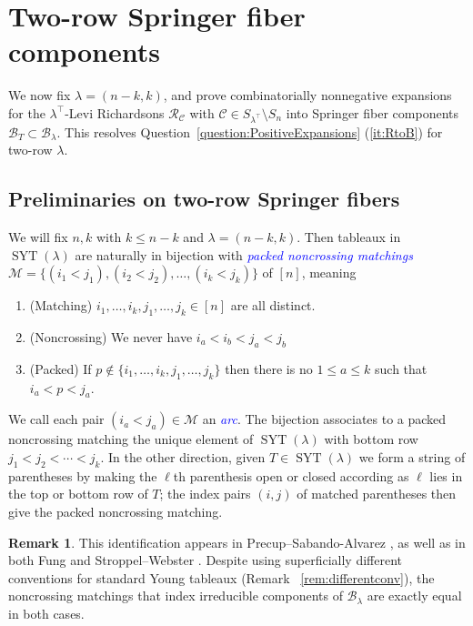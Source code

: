 \documentclass[11pt]{amsart}
\theoremstyle{definition}
\newtheorem{rem}[thm]{Remark}
\numberwithin{equation}{section}
\renewcommand\emph[1]{\textcolor{blue}{\textit{#1}}} %
\newcommand{\syt}{\operatorname{SYT}} %
\begin{document}
\section{Two-row Springer fiber components}

We now fix $\lambda=(n-k,k)$, and prove combinatorially nonnegative expansions for the $\lambda^{\top}$-Levi Richardsons $\mathcal{R}_{\mathcal{C}}$ with $\mathcal{C}\in S_{\lambda^{\top}}\setminus S_n$ into Springer fiber components $\mathcal{B}_T\subset \mathcal{B}_\lambda$. This resolves Question~\ref{question:PositiveExpansions} (\ref{it:RtoB}) for two-row $\lambda$.

\subsection{Preliminaries on two-row Springer fibers}
We will fix $n,k$ with $k\le n-k$ and $\lambda=(n-k,k)$. Then tableaux in $\syt(\lambda)$ are naturally in bijection with \emph{packed noncrossing matchings} $\mathcal{M}=\{(i_1<j_1),(i_2<j_2),\ldots,(i_k<j_k)\}$ of $[n]$, meaning
\begin{enumerate}
\item (Matching) $i_1,\ldots,i_k,j_1,\ldots,j_k\in [n]$ are all distinct.
    \item (Noncrossing) We never have $i_a<i_b<j_a<j_b$
    \item (Packed) If $p\not\in\{i_1,\ldots,i_k,j_1,\ldots,j_k\}$ then there is no $1\le a \le k$ such that $i_a<p<j_a$.
\end{enumerate}
We call each pair $(i_a<j_a)\in\mathcal{M}$ an \emph{arc}.
The bijection associates to a packed noncrossing matching the unique element of $\syt(\lambda)$ with bottom row $j_1<j_2<\cdots<j_k$.
In the other direction, given $T\in \syt(\lambda)$ we form a string of parentheses by making the $\ell$th parenthesis open or closed according as $\ell$ lies in the top or bottom row of $T$; the index pairs $(i,j)$ of matched parentheses then give the packed noncrossing matching.

\begin{rem}This identification appears in Precup--Sabando-Alvarez \cite{sabandoalvarez2026idealsdefiningcomponentstworow}, as well as in both Fung \cite{Fun03} and Stroppel--Webster \cite{SW12}. Despite using superficially different conventions for standard Young tableaux (Remark ~\ref{rem:differentconv}), the noncrossing matchings that index irreducible components of $\mathcal{B}_\lambda$ are exactly equal in both cases.
\end{rem}
\end{document}
